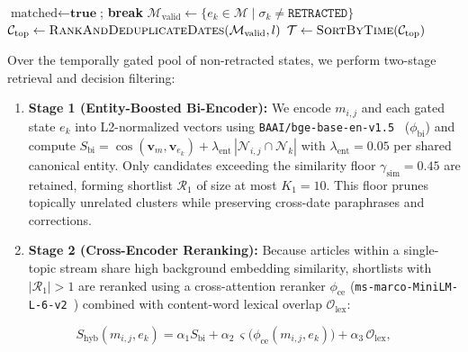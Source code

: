 \documentclass[journal]{IEEEtran}
\begin{document}
\begin{algorithm}[t]
{{{{            }
            $\text{matched} \leftarrow \textbf{true}$; \textbf{break}\;
        }
    }
}
$\mathcal{M}_{\text{valid}} \leftarrow \{e_k \in \mathcal{M} \mid \sigma_k \neq \texttt{RETRACTED}\}$\;
$\mathcal{C}_{\text{top}} \leftarrow \textsc{RankAndDeduplicateDates}(\mathcal{M}_{\text{valid}}, l)$ 
$\mathcal{T} \leftarrow \textsc{SortByTime}(\mathcal{C}_{\text{top}})$\;
\;
\end{algorithm}

Over the temporally gated pool of non-retracted states, we perform two-stage retrieval and decision filtering:
\begin{enumerate}
    \item \textbf{Stage 1 (Entity-Boosted Bi-Encoder):} We encode $m_{i,j}$ and each gated state $e_k$ into L2-normalized vectors using \texttt{BAAI/bge-base-en-v1.5}~\cite{xiao2024cpack} ($\phi_{\text{bi}}$) and compute $S_{\text{bi}} = \cos(\mathbf{v}_{m}, \mathbf{v}_{e_k}) + \lambda_{\text{ent}}\, |\mathcal{N}_{i,j} \cap \mathcal{N}_k|$ with $\lambda_{\text{ent}} = 0.05$ per shared canonical entity. Only candidates exceeding the similarity floor $\gamma_{\text{sim}} = 0.45$ are retained, forming shortlist $\mathcal{R}_1$ of size at most $K_1 = 10$. This floor prunes topically unrelated clusters while preserving cross-date paraphrases and corrections.
    \item \textbf{Stage 2 (Cross-Encoder Reranking):} Because articles within a single-topic stream share high background embedding similarity, shortlists with $|\mathcal{R}_1| > 1$ are reranked using a cross-attention reranker $\phi_{\text{ce}}$ (\texttt{ms-marco-MiniLM-L-6-v2}~\cite{wang2020minilm, nguyen2016msmarco}) combined with content-word lexical overlap $\mathcal{O}_{\text{lex}}$:
\end{enumerate}
\begin{equation}
S_{\text{hyb}}(m_{i,j}, e_k) = \alpha_1 S_{\text{bi}} + \alpha_2\,\varsigma\big(\phi_{\text{ce}}(m_{i,j}, e_k)\big) + \alpha_3\,\mathcal{O}_{\text{lex}},
\label{eq:hybrid_rerank}
\end{equation}
\end{document}
